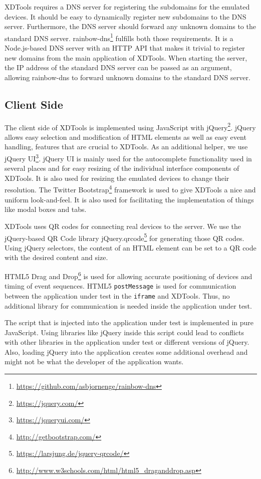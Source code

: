 XDTools requires a DNS server for registering the subdomains for the emulated devices. It should be easy to dynamically register new subdomains to the DNS server. Furthermore, the DNS server should forward any unknown domains to the standard DNS server. rainbow-dns\footnote{\url{https://github.com/asbjornenge/rainbow-dns}} fulfills both those requirements. It is a Node.js-based DNS server with an HTTP API that makes it trivial to register new domains from the main application of XDTools. When starting the server, the IP address of the standard DNS server can be passed as an argument, allowing rainbow-dns to forward unknown domains to the standard DNS server.

\subsection{Client Side}

The client side of XDTools is implemented using JavaScript with jQuery\footnote{\url{https://jquery.com/}}. jQuery allows easy selection and modification of HTML elements as well as easy event handling, features that are crucial to XDTools. As an additional helper, we use jQuery UI\footnote{\url{https://jqueryui.com/}}. jQuery UI is mainly used for the autocomplete functionality used in several places and for easy resizing of the individual interface components of XDTools. It is also used for resizing the emulated devices to change their resolution. The Twitter Bootstrap\footnote{\url{http://getbootstrap.com/}} framework is used to give XDTools a nice and uniform look-and-feel. It is also used for facilitating the implementation of things like modal boxes and tabs. 

XDTools uses QR codes for connecting real devices to the server. We use the jQuery-based QR Code library jQuery.qrcode\footnote{\url{https://larsjung.de/jquery-qrcode/}} for generating those QR codes. Using jQuery selectors, the content of an HTML element can be set to a QR code with the desired content and size.

HTML5 Drag and Drop\footnote{\url{http://www.w3schools.com/html/html5_draganddrop.asp}} is used for allowing accurate positioning of devices and timing of event sequences. HTML5 \lstinline|postMessage| is used for communication between the application under test in the \lstinline|iframe| and XDTools. Thus, no additional library for communication is needed inside the application under test.

The script that is injected into the application under test is implemented in pure JavaScript. Using libraries like jQuery inside this script could lead to conflicts with other libraries in the application under test or different versions of jQuery. Also, loading jQuery into the application creates some additional overhead and might not be what the developer of the application wants.

